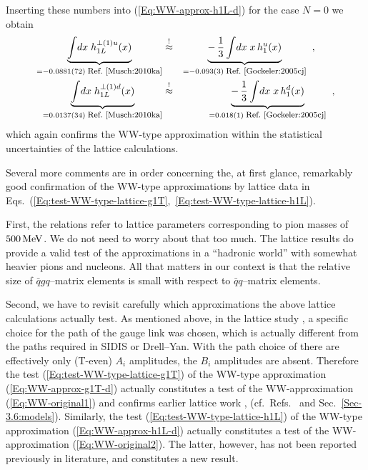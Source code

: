 \documentclass[a4paper,11pt]{article}
\newcommand{\ba}{\begin{eqnarray}}
\newcommand{\ea}{\end{eqnarray}}
\begin{document}
Inserting these numbers into  (\ref{Eq:WW-approx-h1L-d}) for the case
$N=0$ we obtain
\ba
        \underbrace{\int \! d x\;h_{1L}^{\perp(1)u}(x)}
        _{= -0.0881(72)\;\mbox{\footnotesize Ref.~\cite{Musch:2010ka}}}
        &\stackrel{!}{\approx}&
        \underbrace{-\,\frac{1}{3}\int \! d x\;x\,h_1^u(x)}
        _{= -0.093(3) \;\mbox{\footnotesize Ref.~\cite{Gockeler:2005cj}}}
        \hspace{2mm} , \hspace{7mm} \nonumber \\
        \underbrace{\int \! d x\;h_{1L}^{\perp(1)d}(x)}
        _{= 0.0137(34) \;\mbox{\footnotesize Ref.~\cite{Musch:2010ka}}}
        &\stackrel{!}{\approx}&
        \underbrace{-\,\frac{1}{3}\int \! d x\;x\,h_1^d(x)}
        _{= 0.018(1) \;\mbox{\footnotesize Ref.~\cite{Gockeler:2005cj}}}
        \hspace{2mm},
        \label{Eq:test-WW-type-lattice-h1L}
\ea
which again confirms the WW-type approximation within the statistical
uncertainties of the lattice calculations.

Several more comments are in order concerning the, at first glance, remarkably
good confirmation of the  WW-type approximations by lattice data in
Eqs.~(\ref{Eq:test-WW-type-lattice-g1T},~\ref{Eq:test-WW-type-lattice-h1L}).

First, the relations refer to lattice parameters corresponding
to pion masses of $500\,{\rm MeV}$. We do not
need to worry about that too much. The lattice results do provide
a valid test of the approximations in a ``hadronic world'' with
somewhat heavier pions and nucleons. All that matters in our
context is that the relative size of $\bar{q}gq$--matrix elements
is small with respect to $\bar{q}q$--matrix elements.

Second, we have to revisit carefully which approximations the above
lattice calculations actually test. As mentioned above, in
the lattice study \cite{Hagler:2009mb,Musch:2010ka}, a specific choice for
the path of the gauge link was chosen, which is actually different
from the paths required in SIDIS or Drell--Yan. With the path choice of
\cite{Hagler:2009mb,Musch:2010ka} there are effectively only (T-even)
$A_i$ amplitudes, the $B_i$ amplitudes are absent.
Therefore the test (\ref{Eq:test-WW-type-lattice-g1T}) of the WW-type
approximation (\ref{Eq:WW-approx-g1T-d}) actually constitutes a test
of the WW-approximation (\ref{Eq:WW-original1}) and confirms
earlier lattice work \cite{Gockeler:2000ja,Gockeler:2005vw},
(cf.~Refs.~\cite{Metz:2008ib,Teckentrup:2009tk} and
Sec.~\ref{Sec-3.6:models}).
Similarly, the test (\ref{Eq:test-WW-type-lattice-h1L}) of the
WW-type approximation (\ref{Eq:WW-approx-h1L-d}) actually constitutes
a test of the WW-approximation (\ref{Eq:WW-original2}). The latter,
however, has not been reported previously in literature, and constitutes a
new result.
\end{document}
